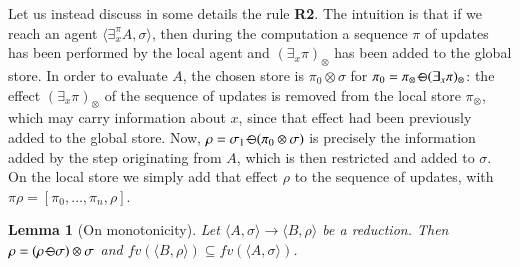 \documentclass[preprint,12pt]{elsarticle}
\newtheorem{lemma}{Lemma}
\def\odiv{\, {\ominus\hspace{-7.7pt} \div} \,}
\begin{document}
Let us instead discuss in some details the rule {\bf R2}.
The intuition is that if we reach an agent $\langle \exists^{\pi}_x A,\sigma\rangle$, then during the computation
a sequence $\pi$ of updates has been performed by the local agent and $(\exists_x \pi)_\otimes$ 
has been added to the global store. In order to evaluate $A$, the chosen 
store is 
$\pi_0 \otimes \sigma$ for $\pi_0 = \pi_\otimes \odiv (\exists_x \pi)_\otimes$: the
effect $(\exists_x \pi)_\otimes$ of the sequence of updates is removed from the local store $\pi_\otimes$,
which may carry information about $x$, since that effect had been previously added to the global store.
%
Now, $\rho = \sigma_1 \odiv (\pi_0 \otimes \sigma)$ 
is precisely the information added by the step originating from $A$, which is then restricted and added to $\sigma$. 
On the local store we simply add that effect $\rho$ to the sequence of updates, with
$\pi \rho = [\pi_0, \ldots, \pi_n, \rho]$.

\begin{lemma}[On monotonicity]
	\label{rmono}
	Let $\langle A, \sigma \rangle \rightarrow \langle B, \rho \rangle$ be a reduction. 
	Then $\rho = (\rho \odiv \sigma) \otimes \sigma$ and $fv(\langle B, \rho \rangle) \subseteq fv(\langle A, \sigma \rangle)$.
\end{lemma}

\end{document}
